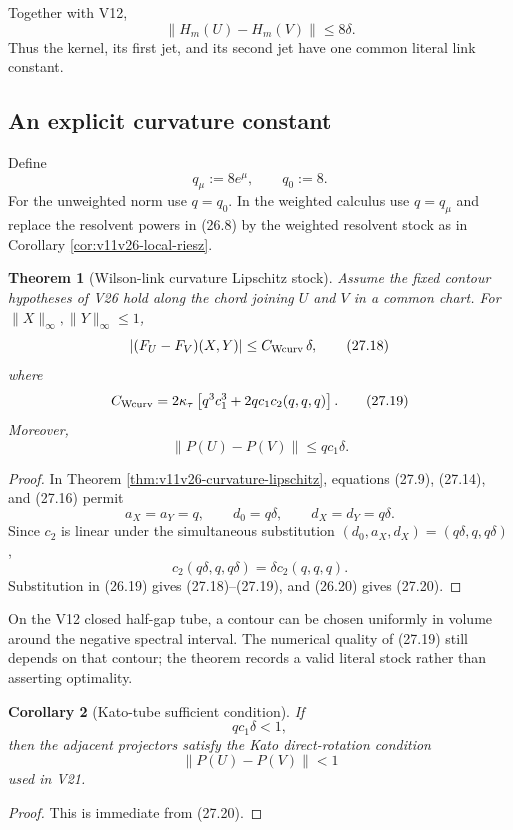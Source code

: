 \documentclass[11pt]{article}
\newtheorem{theorem}{Theorem}[section]
\newtheorem{corollary}[theorem]{Corollary}
\begin{document}
Together with V12,
\[
 \|H_m(U)-H_m(V)\|\leq8\delta.
 \tag{27.16}
\]
Thus the kernel, its first jet, and its second jet have one common
literal link constant.

\subsection{An explicit curvature constant}

Define
\[
 q_\mu:=8e^\mu,\qquad q_0:=8.
 \tag{27.17}
\]
For the unweighted norm use \(q=q_0\).  In the weighted calculus use
\(q=q_\mu\) and replace the resolvent powers in (26.8) by the weighted
resolvent stock as in Corollary \ref{cor:v11v26-local-riesz}.

\begin{theorem}[Wilson-link curvature Lipschitz stock]
\label{thm:v11v27-curvature-stock}
Assume the fixed contour hypotheses of V26 hold along the chord joining
\(U\) and \(V\) in a common chart.  For
\(\|X\|_\infty,\|Y\|_\infty\leq1\),
\[
 |(F_U-F_V)(X,Y)|
 \leq C_{\rm Wcurv}\,\delta,
 \tag{27.18}
\]
where
\[
 C_{\rm Wcurv}
 =
 2\kappa_\tau
 \left[
 q^3c_1^3
 +2q c_1 c_2(q,q,q)
 \right].
 \tag{27.19}
\]
Moreover,
\[
 \|P(U)-P(V)\|\leq q c_1\delta.
 \tag{27.20}
\]
\end{theorem}

\begin{proof}
In Theorem \ref{thm:v11v26-curvature-lipschitz}, equations
(27.9), (27.14), and (27.16) permit
\[
 a_X=a_Y=q,\qquad
 d_0=q\delta,\qquad d_X=d_Y=q\delta.
 \tag{27.21}
\]
Since \(c_2\) is linear under the simultaneous substitution
\((d_0,a_X,d_X)=(q\delta,q,q\delta)\),
\[
 c_2(q\delta,q,q\delta)=\delta c_2(q,q,q).
\]
Substitution in (26.19) gives (27.18)--(27.19), and (26.20) gives
(27.20).
\end{proof}

On the V12 closed half-gap tube, a contour can be chosen uniformly in
volume around the negative spectral interval.  The numerical quality of
(27.19) still depends on that contour; the theorem records a valid
literal stock rather than asserting optimality.

\begin{corollary}[Kato-tube sufficient condition]
\label{cor:v11v27-kato}
If
\[
 q c_1\delta<1,
 \tag{27.22}
\]
then the adjacent projectors satisfy the Kato direct-rotation condition
\[
 \|P(U)-P(V)\|<1
 \tag{27.23}
\]
used in V21.
\end{corollary}

\begin{proof}
This is immediate from (27.20).
\end{proof}
\end{document}
